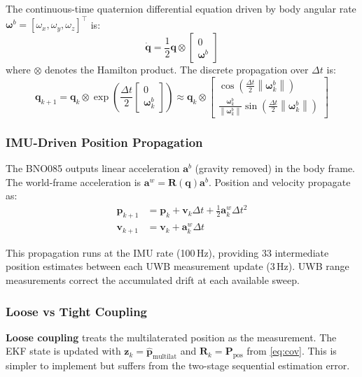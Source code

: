 \documentclass[11pt,a4paper]{article}
\newcommand{\vect}[1]{\bm{#1}}
\newcommand{\mat}[1]{\mathbf{#1}}
\newcommand{\norm}[1]{\left\|#1\right\|}
\newcommand{\Trans}{^{\top}}
\begin{document}
The continuous-time quaternion differential equation driven by body angular rate $\vect{\omega}^b = [\omega_x, \omega_y, \omega_z]\Trans$ is:
\begin{equation}
\dot{\vect{q}} = \frac{1}{2} \vect{q} \otimes \begin{bmatrix}0 \\ \vect{\omega}^b\end{bmatrix}
\label{eq:qdot}
\end{equation}
where $\otimes$ denotes the Hamilton product. The discrete propagation over $\Delta t$ is:
\begin{equation}
\vect{q}_{k+1} = \vect{q}_k \otimes \exp\!\left(\frac{\Delta t}{2}\begin{bmatrix}0 \\ \vect{\omega}^b_k\end{bmatrix}\right) \approx \vect{q}_k \otimes \begin{bmatrix}\cos(\frac{\Delta t}{2}\norm{\vect{\omega}^b_k}) \\ \frac{\vect{\omega}^b_k}{\norm{\vect{\omega}^b_k}}\sin(\frac{\Delta t}{2}\norm{\vect{\omega}^b_k})\end{bmatrix}
\label{eq:qprop}
\end{equation}

\subsubsection{IMU-Driven Position Propagation}

The BNO085 outputs linear acceleration $\vect{a}^b$ (gravity removed) in the body frame. The world-frame acceleration is $\vect{a}^w = \mat{R}(\vect{q}) \vect{a}^b$. Position and velocity propagate as:
\begin{align}
\vect{p}_{k+1} &= \vect{p}_k + \vect{v}_k \Delta t + \tfrac{1}{2} \vect{a}^w_k \Delta t^2 \\
\vect{v}_{k+1} &= \vect{v}_k + \vect{a}^w_k \Delta t
\end{align}

This propagation runs at the IMU rate (100\,Hz), providing 33 intermediate position estimates between each UWB measurement update (3\,Hz). UWB range measurements correct the accumulated drift at each available sweep.

\subsubsection{Loose vs Tight Coupling}

\textbf{Loose coupling} treats the multilaterated position as the measurement. The EKF state is updated with $\vect{z}_k = \hat{\vect{p}}_\text{multilat}$ and $\mat{R}_k = \mat{P}_\text{pos}$ from \cref{eq:cov}. This is simpler to implement but suffers from the two-stage sequential estimation error.
\end{document}
